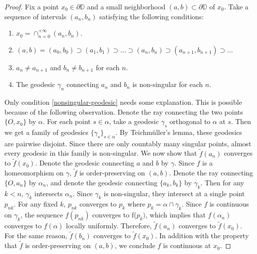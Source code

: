 \documentclass{amsart}
\theoremstyle{plain}
\theoremstyle{definition}
\theoremstyle{remark}
\begin{document}
\begin{proof}
    Fix a point $x_0 \in \partial \mathbb{D}$ and a small neighborhood $(a, b) \subset \partial \mathbb{D}$ of $x_0$.  Take a sequence of intervals $(a_n, b_n)$ satisfying the following conditions:
    \begin{enumerate}
        \item $x_0 = \mathop{\cap}_{n=0}^{+\infty}(a_n, b_n)$.  
        \item $(a, b)=(a_0, b_0)\supset (a_1, b_1) \supset.  .  .  \supset (a_n, b_n) \supset(a_{n+1}, b_{n+1}) \supset.  .  .  $
        \item $a_n \ne a_{n+1}$ and $b_n \ne b_{n+1}$ for each $n$.  
        \item The geodesic $\gamma_n$ connecting $a_n$ and $b_n$ is non-singular for each $n$.  \label{nonsingular-geodesic}
    \end{enumerate}
    Only condition \eqref{nonsingular-geodesic} needs some explanation.  This is possible because of the following observation. Denote the ray connecting the two points $\{O,x_0\}$ by $\alpha$.  For each point $s\in \alpha$, take a geodesic $\gamma_s$ orthogonal to $\alpha$ at $s$.  Then we get a family of geodesics $\{\gamma_s\}_{s\in \alpha}$.  By Teichm\"uller's lemma, these geodesics are pairwise disjoint.  Since there are only countably many singular points, almost every geodesic in this family is non-singular.
%     
    We now show that $\tilde{f}(a_n)$ converges to $\tilde{f}(x_0)$.  Denote the geodesic connecting $a$ and $b$ by $\gamma$.  Since $f$ is a homeomorphism on $\gamma$, $\tilde{f}$ is order-preserving on $(a, b)$.  Denote the ray connecting $\{O, a_n\}$ by $\alpha_n$, and denote the geodesic connecting $\{a_k,b_k\}$ by $\gamma_k$.  Then for any $k<n$, $\gamma_k$ intersects $\alpha_n$.  Since $\gamma_k$ is non-singular, they intersect at a single point $p_{nk}$.  For any fixed $k$, $p_{nk}$ converges to $p_{k}$ where $p_k=\alpha \cap \gamma_k$.  Since $f$ is continuous on $\gamma_k$, the sequence $f(p_{nk})$ converges to  f($p_{k})$, which implies that $f(\alpha_n)$ converges to $f(\alpha)$ locally uniformly.  Therefore, $\tilde{f}(a_n)$ converges to $\tilde{f}(x_0)$.  For the same reason, $\tilde{f}(b_n)$ converges to $\tilde{f}(x_0)$.  In addition with the property that $\tilde{f}$ is order-preserving on $(a,b)$, we conclude $f$ is continuous at $x_0$.  
\end{proof}
\end{document}
